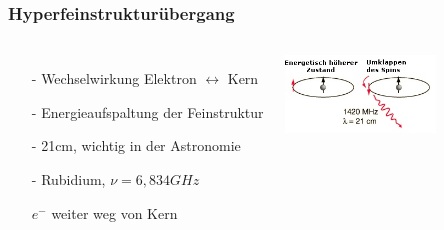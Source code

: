 \begin{frame}
	\frametitle{Hyperfeinstrukturübergang}
	\begin{columns}
		\begin{itemize}
			\item[-] Wechselwirkung Elektron $\leftrightarrow$ Kern
			\item[-] Energieaufspaltung der Feinstruktur
			\item[ ]
			\item[-] 21cm, wichtig in der Astronomie
			\item[] 
			\item[-] Rubidium, $\nu =6,834 GHz$
			\item[ ] $e^-$ weiter weg von Kern
		\end{itemize}
		\includegraphics[width = 4cm]{./pictures/h21b}
	\end{columns}
	
\end{frame}



